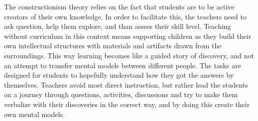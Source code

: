\bigskip\noindent
The constructionism theory relies on the fact that students are to be active creators of their own knowledge. 
In order to facilitate this, the teachers need to ask question, help them explore, and than assess their skill level. 
Teaching without curriculum in this context means supporting children as they build their own intellectual structures with materials and artifacts drawn from the surroundings. 
This way learning becomes like a guided story of discovery, and not an attempt to transfer mental models between different people. 
The tasks are designed for students to hopefully understand how they got the answers by themselves. Teachers avoid most direct instruction, but rather lead the students on a journey through questions, activities, discussions and try to make them verbalize with their discoveries in the correct way, and by doing this create their own mental models.